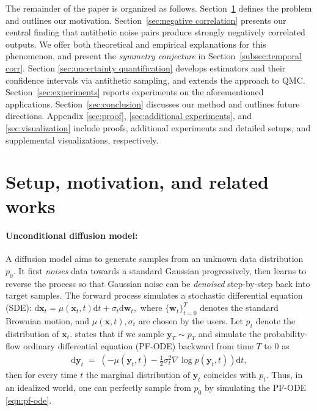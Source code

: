 \documentclass[12pt]{article}
\newcommand{\y}{\mathbf{y}}
\newcommand{\x}{\mathbf{x}}
\newcommand{\0}{\mathbf{0}}
\newcommand{\w}{\mathbf{w}}
\newcommand{\diff}{\mathrm{d}}
\begin{document}
The remainder of the paper is organized as follows. 
Section~\ref{sec:setup} defines the problem and outlines our motivation. 
Section~\ref{sec:negative correlation} presents our central finding that antithetic noise pairs produce strongly negatively correlated outputs. We offer both theoretical and empirical explanations for this phenomenon, and present the \textit{symmetry conjecture} in Section~\ref{subsec:temporal corr}.
Section \ref{sec:uncertainty quantification} develops estimators and their confidence intervals via antithetic sampling, and extends the approach to QMC.
Section~\ref{sec:experiments} reports  experiments on the aforementioned applications. 
 Section~\ref{sec:conclusion} discusses our method and outlines future directions. Appendix \ref{sec:proof}, \ref{sec:additional experiments}, and \ref{sec:visualization} include proofs, additional experiments and detailed setups, and supplemental visualizations, respectively.



\section{Setup, motivation, and related works}\label{sec:setup}
\paragraph{Unconditional diffusion model:}


A diffusion model aims to generate samples from an unknown data distribution $p_0$. It first \emph{noises} data towards a standard Gaussian progressively, then learns to reverse the process so that Gaussian noise can be \emph{denoised} step-by-step back into target samples. The forward process simulates a stochastic differential equation (SDE): 
 $ \diff\x_t = \mu( \x_t,t) \diff t + \sigma_t \diff\w_t, $
 where $\{\w_t\}_{t=0}^T$ denotes the standard Brownian motion, and $\mu(\x, t), \sigma_t$ are chosen by the users. Let $p_t$ denote the distribution of $\x_t$. \citet{song2021scorebased} states that if we sample $\y_T \sim p_T$ and simulate the probability-flow ordinary differential equation (PF-ODE) backward from time $T$ to $0$ as
\begin{align}\label{eqn:pf-ode}
\diff\y_t \;=\; \left(-\mu(\y_t, t) - \frac{1}{2}\sigma_t^2\nabla \log p(\y_t, t)\right) \diff t,
\end{align}
then for every time $t$ the marginal distribution of $\y_t$ coincides with $p_t$. Thus, in an idealized world, one can perfectly sample from $p_0$ by simulating the PF-ODE \eqref{eqn:pf-ode}. 
\end{document}
